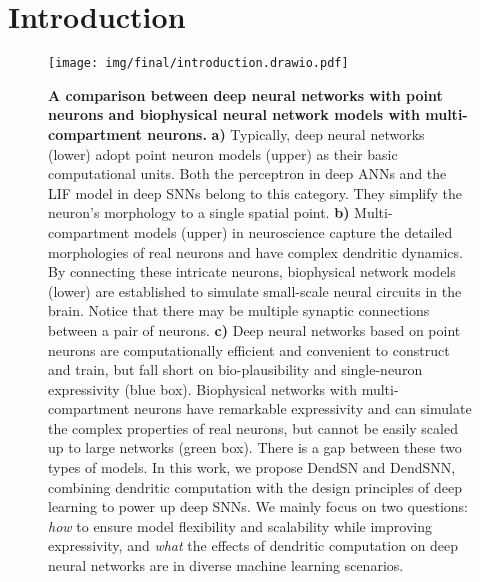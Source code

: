 \section*{Introduction}
\label{sec:introduction}

\begin{figure}[tp!]
    \centering
    \texttt{[image: img/final/introduction.drawio.pdf]}
    \caption{
        \textbf{A comparison between deep neural networks with point neurons and biophysical neural network models with multi-compartment neurons.}
        \textbf{a)} Typically, deep neural networks (lower) adopt point neuron models (upper) as their basic computational units. Both the perceptron in deep ANNs and the LIF model in deep SNNs belong to this category. They simplify the neuron's morphology to a single spatial point.
        \textbf{b)} Multi-compartment models (upper) in neuroscience capture the detailed morphologies of real neurons and have complex dendritic dynamics. By connecting these intricate neurons, biophysical network models (lower) are established to simulate small-scale neural circuits in the brain. Notice that there may be multiple synaptic connections between a pair of neurons.
        \textbf{c)} Deep neural networks based on point neurons are computationally efficient and convenient to construct and train, but fall short on bio-plausibility and single-neuron expressivity (blue box). Biophysical networks with multi-compartment neurons have remarkable expressivity and can simulate the complex properties of real neurons, but cannot be easily scaled up to large networks (green box). There is a gap between these two types of models. In this work, we propose DendSN and DendSNN, combining dendritic computation with the design principles of deep learning to power up deep SNNs. We mainly focus on two questions: \textit{how} to ensure model flexibility and scalability while improving expressivity, and \textit{what} the effects of dendritic computation on deep neural networks are in diverse machine learning scenarios.
    }
    \label{fig:introduction}
\end{figure}

